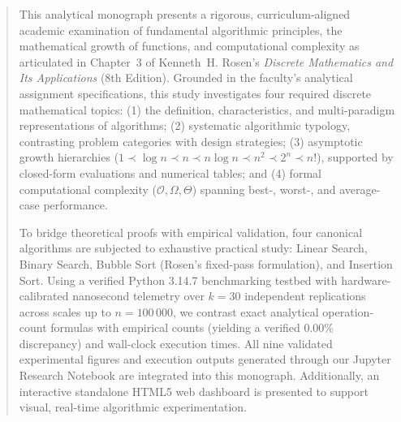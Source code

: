 \documentclass[11pt,a4paper,oneside]{report}
\theoremstyle{definition}
\begin{document}
\setcounter{page}{2}

\begin{abstract}
This analytical monograph presents a rigorous, curriculum-aligned academic examination of fundamental algorithmic principles, the mathematical growth of functions, and computational complexity as articulated in Chapter~3 of Kenneth~H. Rosen's \emph{Discrete Mathematics and Its Applications} (8th Edition). Grounded in the faculty's analytical assignment specifications, this study investigates four required discrete mathematical topics: (1) the definition, characteristics, and multi-paradigm representations of algorithms; (2) systematic algorithmic typology, contrasting problem categories with design strategies; (3) asymptotic growth hierarchies ($1 \prec \log n \prec n \prec n \log n \prec n^2 \prec 2^n \prec n!$), supported by closed-form evaluations and numerical tables; and (4) formal computational complexity ($\mathcal{O}, \Omega, \Theta$) spanning best-, worst-, and average-case performance.

To bridge theoretical proofs with empirical validation, four canonical algorithms are subjected to exhaustive practical study: Linear Search, Binary Search, Bubble Sort (Rosen's fixed-pass formulation), and Insertion Sort. Using a verified Python 3.14.7 benchmarking testbed with hardware-calibrated nanosecond telemetry over $k = 30$ independent replications across scales up to $n = 100\,000$, we contrast exact analytical operation-count formulas with empirical counts (yielding a verified 0.00\% discrepancy) and wall-clock execution times. All nine validated experimental figures and execution outputs generated through our Jupyter Research Notebook are integrated into this monograph. Additionally, an interactive standalone HTML5 web dashboard is presented to support visual, real-time algorithmic experimentation.
\end{abstract}


\newpage
\tableofcontents
\newpage
\listoffigures
\vspace{0.5cm}
\listoftables
\end{document}
